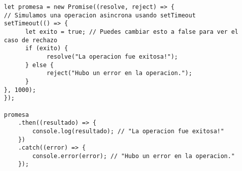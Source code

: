 \documentclass{article}
\begin{document}
\begin{enumerate}
\begin{lstlisting}
let promesa = new Promise((resolve, reject) => {
// Simulamos una operacion asincrona usando setTimeout
setTimeout(() => {
      let exito = true; // Puedes cambiar esto a false para ver el caso de rechazo
      if (exito) {
            resolve("La operacion fue exitosa!");
      } else {
            reject("Hubo un error en la operacion.");
      }
}, 1000);
});

promesa
    .then((resultado) => {
        console.log(resultado); // "La operacion fue exitosa!"
    })
    .catch((error) => {
        console.error(error); // "Hubo un error en la operacion."
    });


\end{lstlisting}
      
\end{enumerate}
\end{document}
